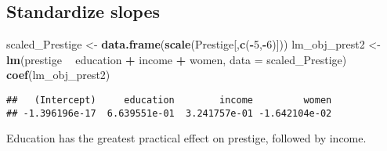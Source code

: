 \documentclass[
]{article}
\newenvironment{Shaded}{\begin{snugshade}}{\end{snugshade}}
\newcommand{\DataTypeTok}[1]{\textcolor[rgb]{0.13,0.29,0.53}{#1}}
\newcommand{\DecValTok}[1]{\textcolor[rgb]{0.00,0.00,0.81}{#1}}
\newcommand{\KeywordTok}[1]{\textcolor[rgb]{0.13,0.29,0.53}{\textbf{#1}}}
\newcommand{\NormalTok}[1]{#1}
\newcommand{\OperatorTok}[1]{\textcolor[rgb]{0.81,0.36,0.00}{\textbf{#1}}}
\newcommand{\StringTok}[1]{\textcolor[rgb]{0.31,0.60,0.02}{#1}}
\begin{document}
\hypertarget{standardize-slopes}{%
\subsection{Standardize slopes}\label{standardize-slopes}}

\begin{Shaded}
\begin{Highlighting}[]
\NormalTok{scaled_Prestige <-}\StringTok{ }\KeywordTok{data.frame}\NormalTok{(}\KeywordTok{scale}\NormalTok{(Prestige[,}\KeywordTok{c}\NormalTok{(}\OperatorTok{-}\DecValTok{5}\NormalTok{,}\OperatorTok{-}\DecValTok{6}\NormalTok{)]))}
\NormalTok{lm_obj_prest2 <-}\StringTok{ }\KeywordTok{lm}\NormalTok{(prestige }\OperatorTok{~}\StringTok{ }\NormalTok{education }\OperatorTok{+}\StringTok{ }\NormalTok{income }\OperatorTok{+}\StringTok{ }\NormalTok{women, }\DataTypeTok{data =}\NormalTok{ scaled_Prestige)}
\KeywordTok{coef}\NormalTok{(lm_obj_prest2)}
\end{Highlighting}
\end{Shaded}

\begin{verbatim}
##   (Intercept)     education        income         women 
## -1.396196e-17  6.639551e-01  3.241757e-01 -1.642104e-02
\end{verbatim}

Education has the greatest practical effect on prestige, followed by
income.
\end{document}
